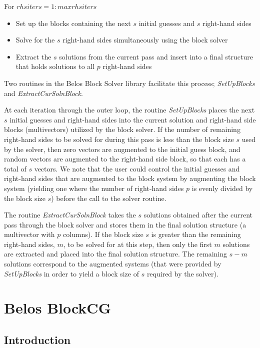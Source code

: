 \documentclass{article}
\begin{document}
For $rhsiters = 1:maxrhsiters$
\begin{itemize}
\item Set up the blocks containing the next $s$ initial guesses
and $s$ right-hand sides
\item Solve for the $s$ right-hand sides simultaneously using the
block solver
\item Extract the $s$ solutions from the current pass and insert
into a final structure that holds solutions to all $p$ right-hand
sides
\end{itemize}
\vspace{0.2in}

Two routines in the Belos Block Solver library facilitate this
process; {\it SetUpBlocks} and {\it ExtractCurSolnBlock}.

At each iteration through the outer loop, the routine {\it
SetUpBlocks} places the next $s$ initial guesses and right-hand
sides into the current solution and right-hand side blocks
(multivectors) utilized by the block solver. If the number of
remaining right-hand sides to be solved for during this pass is
less than the block size $s$ used by the solver, then zero vectors
are augmented to the initial guess block, and random vectors are
augmented to the right-hand side block, so that each has a total
of $s$ vectors. We note that the user could control the initial
guesses and right-hand sides that are augmented to the block
system by augmenting the block system (yielding one where the
number of right-hand sides $p$ is evenly divided by the block size
$s$) before the call to the solver routine.

The routine {\it ExtractCurSolnBlock} takes the $s$ solutions
obtained after the current pass through the block solver and
stores them in the final solution structure (a multivector with
$p$ columns). If the block size $s$ is greater than the remaining
right-hand sides, $m$, to be solved for at this step, then only
the first $m$ solutions are extracted and placed into the final
solution structure. The remaining $s-m$ solutions correspond to
the augmented systems (that were provided by {\it SetUpBlocks} in
order to yield a block size of $s$ required by the solver).


\section{Belos BlockCG}

\subsection{Introduction}
\end{document}
